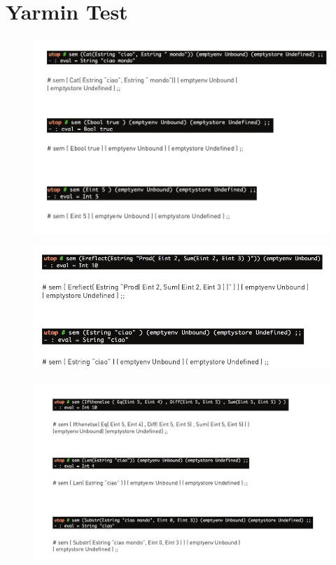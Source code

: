 \chapter{ Yarmin Test }

\begin{figure}[H]
	
	\centering
	\includegraphics[width=1.5\textwidth,center]{Immagini/test1.png}
	
\end{figure}

\begin{figure}[H]
	
	\centering
	\includegraphics[width=1.4\textwidth,center]{Immagini/test2.png}
	
\end{figure}

\begin{figure}[H]
	
	\centering
	\includegraphics[width=1.5\textwidth,center]{Immagini/test3.png}
	
\end{figure}
